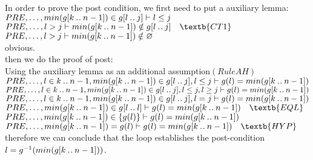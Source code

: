 \documentclass[11pt,a4paper,fleqn]{article}
\begin{document}
\noindent
In order to prove the post condition, we first need to put a auxiliary lemma:\\
$PRE, \ldots ,min(g[k \mathbin{.\mkern1mu.} n-1]) \in g[l \mathbin{.\mkern1mu.} j] \vdash l \le j $\\
$PRE, \ldots, l>j \vdash min(g[k \upto n-1]) \notin g[l \upto j] \quad \textb{CT1}$\\
$PRE, \ldots, l>j \vdash min(g[k \mathbin{.\mkern1mu.} n-1]) \notin \mathord\varnothing $\\
obvious.\\

\noindent
then we do the proof of post:\\
Using the auxiliary lemma as an additional assumption$(Rule AH)$\\
$PRE,\ldots,l \in k \mathbin{.\mkern1mu.} n-1,min(g[k \mathbin{.\mkern1mu.} n-1]) \in g[l \mathbin{.\mkern1mu.} j],l \le j \vdash g(l) = min(g[k \mathbin{.\mkern1mu.} n-1])$\\
$PRE,\ldots,l \in k \mathbin{.\mkern1mu.} n-1,min(g[k \mathbin{.\mkern1mu.} n-1]) \in g[l \mathbin{.\mkern1mu.} j],l \le j,l \ge j \vdash g(l) = min(g[k \mathbin{.\mkern1mu.} n-1])$\\
$PRE,\ldots,l \in k \mathbin{.\mkern1mu.} n-1,min(g[k \mathbin{.\mkern1mu.} n-1]) \in g[l \mathbin{.\mkern1mu.} j],l =j \vdash g(l) = min(g[k \mathbin{.\mkern1mu.} n-1])$\\
$PRE,\ldots,min(g[k \upto n-1]) \in g[l \upto l] \vdash g(l) = min(g[k \upto n-1]) \quad \textb{EQL}$\\
$PRE,\ldots,min(g[k \mathbin{.\mkern1mu.} n-1]) \in \{g(l)\} \vdash g(l) = min(g[k \mathbin{.\mkern1mu.} n-1]) $\\
$PRE,\ldots,min(g[k \upto n-1]) = g(l) \vdash g(l) = min(g[k \upto n-1]) \quad \textb{HYP}$\\

therefore we can conclude that the loop establishes the post-condition $  l = g^{-1}(min(g[k \mathbin{.\mkern1mu.} n-1])) $.\\    







\end{document}

